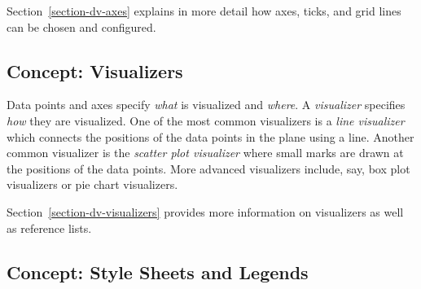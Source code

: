Section~\ref{section-dv-axes} explains in more detail how axes, ticks, and grid
lines can be chosen and configured.


\subsection{Concept: Visualizers}

Data points and axes specify \emph{what} is visualized and \emph{where}. A
\emph{visualizer} specifies \emph{how} they are visualized. One of the most
common visualizers is a \emph{line visualizer} which connects the positions of
the data points in the plane using a line. Another common visualizer is the
\emph{scatter plot visualizer} where small marks are drawn at the positions of
the data points. More advanced visualizers include, say, box plot visualizers
or pie chart visualizers.
%
\begin{codeexample}[preamble={\usetikzlibrary{datavisualization.formats.functions}}]
\end{codeexample}
%
\begin{codeexample}[preamble={\usetikzlibrary{datavisualization.formats.functions}}]
\end{codeexample}

Section~\ref{section-dv-visualizers} provides more information on visualizers
as well as reference lists.


\subsection{Concept: Style Sheets and Legends}

